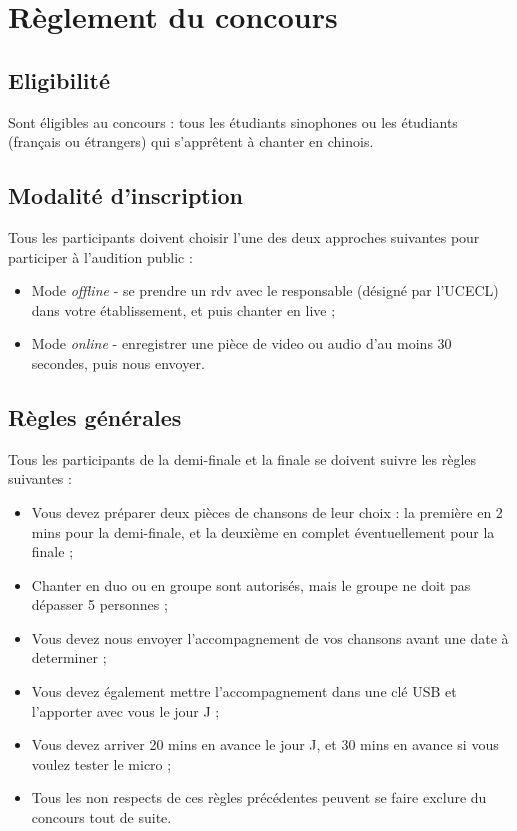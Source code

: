 \documentclass[11pt,fleqn]{book} %
\begin{document}
\section{R\`eglement du concours}

\subsection{Eligibilit\'e}

Sont \'eligibles au concours : tous les \'etudiants sinophones ou les \'etudiants (fran\c cais ou \'etrangers) qui s'appr\^etent \`a chanter en chinois.

\subsection{Modalit\'e d'inscription}

Tous les participants doivent choisir l'une des deux approches suivantes pour participer \`a l'audition public :
\begin{itemize}[label=\textbullet]
    \item Mode \emph{offline} - se prendre un rdv avec le responsable (d\'esign\'e par l'UCECL) dans votre \'etablissement, et puis chanter en live ;
    \item Mode \emph{online} - enregistrer une pi\`ece de video ou audio d'au moins 30 secondes, puis nous envoyer.
\end{itemize}

\subsection{R\`egles g\'en\'erales}

Tous les participants de la demi-finale et la finale se doivent suivre les r\`egles suivantes :
\begin{itemize}[label=\textbullet]
    \item Vous devez pr\'eparer deux pi\`eces de chansons de leur choix : la premi\`ere en 2 mins pour la demi-finale, et la deuxi\`eme en complet \'eventuellement pour la finale ;
    \item Chanter en duo ou en groupe sont autoris\'es, mais le groupe ne doit pas d\'epasser 5 personnes ;
    \item Vous devez nous envoyer l'accompagnement de vos chansons avant une date \`a determiner ;
    \item Vous devez \'egalement mettre l'accompagnement dans une cl\'e USB et l'apporter avec vous le jour J ;
    \item Vous devez arriver 20 mins en avance le jour J, et 30 mins en avance si vous voulez tester le micro ;
    \item Tous les non respects de ces r\`egles pr\'ec\'edentes peuvent se faire exclure du concours tout de suite.
\end{itemize}
\end{document}
